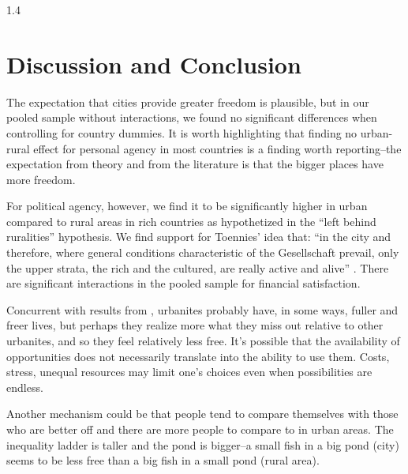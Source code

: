 \documentclass[10pt, letterpaper]{article}
\begin{document}
\begin{spacing}{1.4}
\section{Discussion and Conclusion}

The expectation that cities provide greater freedom is plausible, but in our
pooled sample without interactions, we found no significant differences when
controlling for country dummies.
It is worth highlighting that finding no urban-rural effect for personal agency in most countries is a finding worth reporting--the expectation from theory and from the literature is that the bigger places have more freedom. %

For political agency, however, we find it to be significantly higher in urban compared to rural areas in rich countries as hypothetized in the ``left behind ruralities'' hypothesis.
We find support for Toennies' idea that: ``in the city and therefore, where general conditions characteristic of the Gesellschaft prevail, only the upper strata, the rich and the cultured, are really active and alive'' \citep[p. 227]{tonnies57}.
There are significant interactions in the pooled sample for financial satisfaction. 

  
Concurrent with results from \citet{aok24swls}, urbanites probably have, in some ways, fuller and freer lives, but perhaps
they realize more what they miss out relative to other urbanites, and so they feel relatively less free. It's possible that the availability of opportunities does not necessarily translate into the ability to use them. Costs, stress, unequal resources may limit one's choices even when possibilities are endless.   

Another mechanism could be that people tend to compare themselves with those who are better off\citep{frey02s} and there are more people to compare to in urban areas. The inequality ladder is taller and the pond is bigger--a small fish in a big pond (city) seems to be less free than a big fish in a small pond (rural area). 


\end{spacing}
\end{document}
